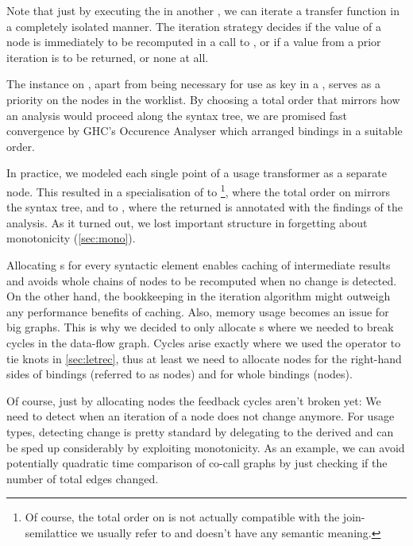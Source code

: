 Note that just by executing the  in another , we can iterate a transfer function in a completely isolated manner.
The iteration strategy decides if the value of a node is immediately to be recomputed in a call to , or if a value from a prior iteration is to be returned, or none at all.

The  instance on , apart from being necessary for use as key in a , serves as a priority on the nodes in the worklist.
By choosing a total order that mirrors how an analysis would proceed along the syntax tree, we are promised fast convergence by GHC's Occurence Analyser which arranged bindings in a suitable order.

In practice, we modeled each single point of a usage transformer as a separate node. 
This resulted in a specialisation of  to \footnote{Of course, the total order on  is not actually compatible with the join-semilattice we usually refer to and doesn't have any semantic meaning.}, where the total order on  mirrors the syntax tree, and  to , where the returned  is annotated with the findings of the analysis.
As it turned out, we lost important structure in forgetting about monotonicity (\cf \cref{sec:mono}).\smallskip

Allocating s for every syntactic element enables caching of intermediate results and avoids whole chains of nodes to be recomputed when no change is detected.
On the other hand, the bookkeeping in the iteration algorithm might outweigh any performance benefits of caching.
Also, memory usage becomes an issue for big graphs.
This is why we decided to only allocate s where we needed to break cycles in the data-flow graph.
Cycles arise exactly where we used the \fix operator to tie knots in \cref{sec:letrec}, thus at least we need to allocate nodes for the right-hand sides of bindings (referred to as  nodes) and for whole  bindings ( nodes).

Of course, just by allocating nodes the feedback cycles aren't broken yet:
We need to detect when an iteration of a node does not change anymore. 
For usage types, detecting change is pretty standard by delegating to the derived  and can be sped up considerably by exploiting monotonicity.
As an example, we can avoid potentially quadratic time comparison of co-call graphs by just checking if the number of total edges changed.

